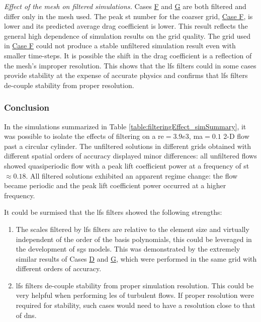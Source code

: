 \emph{Effect of the mesh on filtered simulations.} Cases \hyperlink{caseF}{F} and \hyperlink{caseG}{G} are both filtered and differ only in the mesh used. The peak \gls{st} number for the coarser grid, \hyperlink{caseF}{Case F}, is lower and its predicted average drag coefficient is lower. This result reflects the general high dependence of simulation results on the grid quality. The grid used in \hyperlink{caseF}{Case F} could not produce a stable unfiltered simulation result even with smaller time-steps. It is possible the shift in the drag coefficient is a reflection of the mesh's improper resolution. This shows that the \gls{lfs} filters could in some cases provide stability at the expense of accurate physics and confirms that \gls{lfs} filters de-couple stability from proper resolution.



\subsubsection{Conclusion}
\label{sec:filterEffectsConclusion}
In the simulations summarized in Table \ref{table:filteringEffect_simSummary}, it was possible to isolate the effects of filtering on a \gls{re}$=3.9e3$, \gls{ma}$=0.1$ 2-D flow past a circular cylinder. The unfiltered solutions in different grids obtained with different spatial orders of accuracy displayed minor differences: all unfiltered flows showed quasiperiodic flow with a peak lift coefficient power at a frequency of \gls{st}$\approx 0.18$. All filtered solutions exhibited an apparent regime change: the flow became periodic and the peak lift coefficient power occurred at a higher frequency.

It could be surmised that the \gls{lfs} filters showed the following strengths:
\begin{enumerate}
\item The scales filtered by \gls{lfs} filters are relative to the element size and virtually independent of the order of the basis polynomials, this could be leveraged in the development of \gls{sgs} models. This was demonstrated by the extremely similar results of Cases \hyperlink{caseD}{D} and \hyperlink{caseG}{G}, which were performed in the same grid with different orders of accuracy.
\item \gls{lfs} filters de-couple stability from proper simulation resolution. This could be very helpful when performing \gls{les} of turbulent flows. If proper resolution were required for stability, such cases would need to have a resolution close to that of \gls{dns}.
\end{enumerate}

